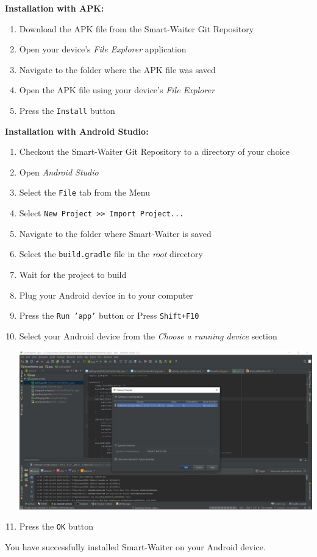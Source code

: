 \documentclass[12pt, titlepage]{article}
\begin{document}
\textbf{\newline Installation with APK:}
	\begin{enumerate}
		\item Download the APK file from the Smart-Waiter Git Repository
		\item Open your device's \emph{File Explorer} application
		\item Navigate to the folder where the APK file was saved
		\item Open the APK file using your device's \emph{File Explorer}
		\item Press the \texttt{Install} button
	\end{enumerate}

\textbf{\newline Installation with Android Studio:}
	\begin{enumerate}
		\item Checkout the Smart-Waiter Git Repository to a directory of 				your choice
		\item Open \emph{Android Studio}
		\item Select the \texttt{File} tab from the Menu
		\item Select \texttt{New Project >> Import Project...}
		\item Navigate to the folder where Smart-Waiter is saved
		\item Select the \texttt{build.gradle} file in the \emph{root} 					directory
		\item Wait for the project to build
		\item Plug your Android device in to your computer 
		\item Press the \texttt{Run 'app'} button or Press \texttt{Shift+F10}
		\item Select your Android device from the \emph{Choose a running device} section
		\begin{center}
			\includegraphics[width=1.0\textwidth]{android-studio.png}
		\end{center}
		\item Press the \texttt{OK} button		
	\end{enumerate}
You have successfully installed Smart-Waiter on your Android device.
\end{document}

